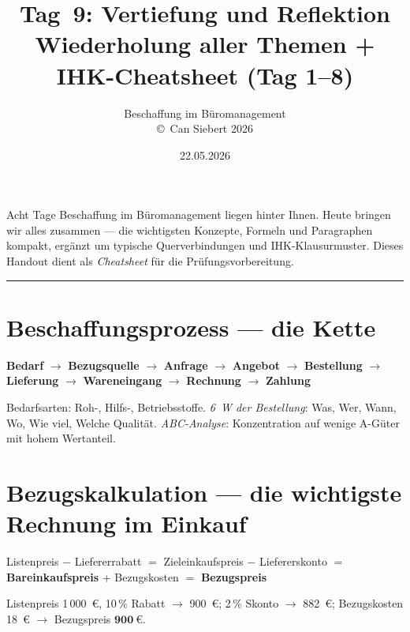 \documentclass[11pt, a4paper]{article}
\title{\vspace*{-1.5cm}\Huge\bfseries\color{bfwPrimaryDark}Tag~9: Vertiefung und Reflektion\\[0.4em]
  \large\color{bfwInkSoft}\textnormal{Wiederholung aller Themen + IHK-Cheatsheet (Tag 1--8)}}
\author{\textsf{Beschaffung im Büromanagement}\\
\textsf{\small\copyright\ Can Siebert\,\textperiodcentered\,2026}}
\date{22.05.2026}
\begin{document}
\maketitle
\thispagestyle{empty}

\vspace{1em}
\begin{merksatz}[title={\bfseries Worum geht es heute?}]
Acht Tage Beschaffung im Büromanagement liegen hinter Ihnen. Heute bringen wir
alles zusammen --- die wichtigsten Konzepte, Formeln und Paragraphen kompakt,
ergänzt um typische Querverbindungen und IHK-Klausurmuster. Dieses Handout dient
als \emph{Cheatsheet} für die Prüfungsvorbereitung.
\end{merksatz}

\tableofcontents
\vspace{1em}
\hrule
\vspace{1em}

\section{Beschaffungsprozess --- die Kette}

\begin{merksatz}[title={Die Schritte}]
\textbf{Bedarf} $\to$ \textbf{Bezugsquelle} $\to$ \textbf{Anfrage} $\to$ \textbf{Angebot} $\to$ \textbf{Bestellung} $\to$ \textbf{Lieferung} $\to$ \textbf{Wareneingang} $\to$ \textbf{Rechnung} $\to$ \textbf{Zahlung}
\end{merksatz}

Bedarfsarten: Roh-, Hilfs-, Betriebsstoffe. \emph{6~W der Bestellung}: Was, Wer,
Wann, Wo, Wie viel, Welche Qualität. \emph{ABC-Analyse}: Konzentration auf wenige
A-Güter mit hohem Wertanteil.

\section{Bezugskalkulation --- die wichtigste Rechnung im Einkauf}

\begin{merksatz}[title={Bezugskalkulation}]
Listenpreis $-$ Liefererrabatt $=$ Zieleinkaufspreis $-$ Liefererskonto $=$
\textbf{Bareinkaufspreis} $+$ Bezugskosten $=$ \textbf{Bezugspreis}
\end{merksatz}

\begin{beispiel}
Listenpreis 1\,000~€, 10\,\% Rabatt $\to$ 900~€; 2\,\% Skonto $\to$ 882~€;
Bezugskosten 18~€ $\to$ Bezugspreis $\mathbf{900~€}$.
\end{beispiel}
\end{document}
